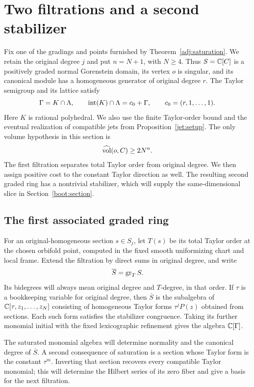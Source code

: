 \section{Two filtrations and a second stabilizer}\label{filt:section}

Fix one of the gradings and points furnished by
Theorem~\ref{adj:saturation}.  We retain the original degree $j$ and put
$n=N+1$, with $N\geq4$.  Thus $S=\mathbb C[C]$ is a positively graded normal
Gorenstein domain, its vertex $o$ is singular, and its canonical module has
a homogeneous generator of original degree $r$.  The Taylor semigroup and
its lattice satisfy
\begin{equation}\label{filt:semigroup-input}
 \Gamma=K\cap\Lambda,\qquad
 \operatorname{int}(K)\cap\Lambda=c_0+\Gamma,\qquad
 c_0=(r,1,\ldots,1).
\end{equation}
Here $K$ is rational polyhedral.  We also use the finite Taylor-order
bound and the eventual realization of compatible jets from
Proposition~\ref{jet:setup}.  The only volume hypothesis in this section is
\begin{equation}\label{filt:volume-hypothesis}
 \widehat{\operatorname{vol}}(o,C)\geq 2N^n.
\end{equation}
The first filtration separates total Taylor order from original degree.
We then assign positive cost to the constant Taylor direction as well.
The resulting second graded ring has a nontrivial stabilizer, which will
supply the same-dimensional slice in Section~\ref{boot:section}.

\subsection{The first associated graded ring}

For an original-homogeneous section $s\in S_j$, let $T(s)$ be its total
Taylor order at the chosen orbifold point, computed in the fixed smooth
uniformizing chart and local frame.  Extend the filtration by direct sums
in original degree, and write
\[
 \overline S=\operatorname{gr}_T S.
\]
Its bidegrees will always mean original degree and $T$-degree, in that
order.  If $\tau$ is a bookkeeping variable for original degree, then
$\overline S$ is the subalgebra of $\mathbb C[\tau,z_1,\ldots,z_N]$ consisting of
homogeneous Taylor forms $\tau^jP(z)$ obtained from sections.  Each such
form satisfies the stabilizer congruence.  Taking its further monomial
initial with the fixed lexicographic refinement gives the algebra
$\mathbb C[\Gamma]$.

The saturated monomial algebra will determine normality and the canonical
degree of $\overline S$.  A second consequence of saturation is a section
whose Taylor form is the constant $\tau^m$.  Inverting that section
recovers every compatible Taylor monomial; this will determine the
Hilbert series of its zero fiber and give a basis for the next filtration.

